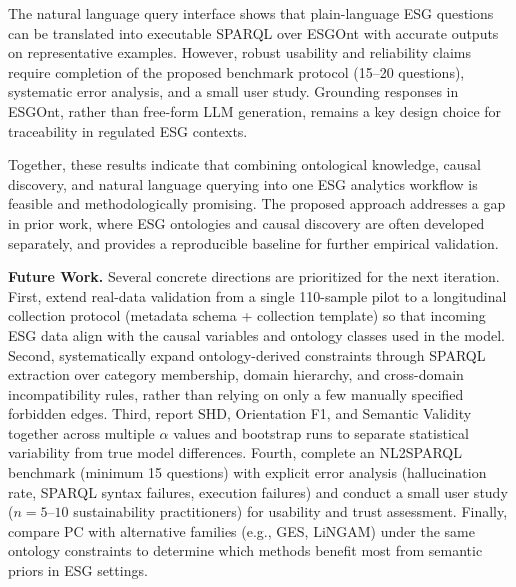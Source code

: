 \documentclass[a4paper,11pt,oneside]{article}
\begin{document}
The natural language query interface shows that plain-language ESG questions can be translated into executable SPARQL over ESGOnt with accurate outputs on representative examples. However, robust usability and reliability claims require completion of the proposed benchmark protocol (15--20 questions), systematic error analysis, and a small user study. Grounding responses in ESGOnt, rather than free-form LLM generation, remains a key design choice for traceability in regulated ESG contexts.

Together, these results indicate that combining ontological knowledge, causal discovery, and natural language querying into one ESG analytics workflow is feasible and methodologically promising. The proposed approach addresses a gap in prior work, where ESG ontologies and causal discovery are often developed separately, and provides a reproducible baseline for further empirical validation.

\textbf{Future Work.} Several concrete directions are prioritized for the next iteration. First, extend real-data validation from a single 110-sample pilot to a longitudinal collection protocol (metadata schema + collection template) so that incoming ESG data align with the causal variables and ontology classes used in the model. Second, systematically expand ontology-derived constraints through SPARQL extraction over category membership, domain hierarchy, and cross-domain incompatibility rules, rather than relying on only a few manually specified forbidden edges. Third, report SHD, Orientation F1, and Semantic Validity together across multiple $\alpha$ values and bootstrap runs to separate statistical variability from true model differences. Fourth, complete an NL2SPARQL benchmark (minimum 15 questions) with explicit error analysis (hallucination rate, SPARQL syntax failures, execution failures) and conduct a small user study ($n=5$--$10$ sustainability practitioners) for usability and trust assessment. Finally, compare PC with alternative families (e.g., GES, LiNGAM) under the same ontology constraints to determine which methods benefit most from semantic priors in ESG settings.

\newpage
\end{document}
